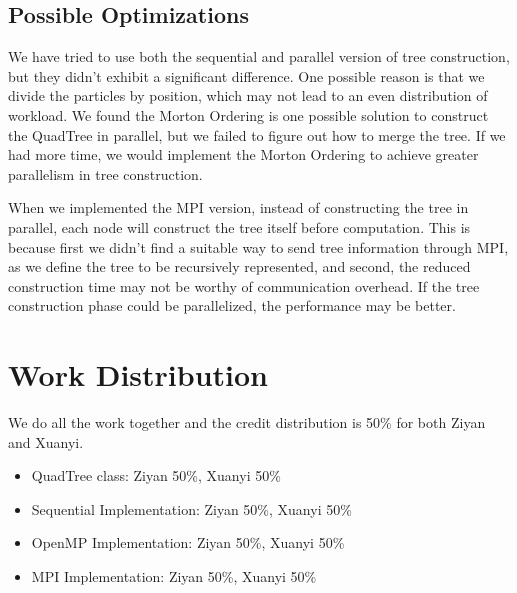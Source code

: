 \documentclass{article}
\begin{document}
\subsection{Possible Optimizations}
We have tried to use both the sequential and parallel version of tree construction, but they didn't exhibit a significant difference. One possible reason is that we divide the particles by position, which may not lead to an even distribution of workload. We found the Morton Ordering is one possible solution to construct the QuadTree in parallel, but we failed to figure out how to merge the tree. If we had more time, we would implement the Morton Ordering to achieve greater parallelism in tree construction.

When we implemented the MPI version, instead of constructing the tree in parallel, each node will construct the tree itself before computation. This is because first we didn't find a suitable way to send tree information through MPI, as we define the tree to be recursively represented, and second, the reduced construction time may not be worthy of communication overhead. If the tree construction phase could be parallelized, the performance may be better. 

\section{Work Distribution}
We do all the work together and the credit distribution is 50\% for both Ziyan and Xuanyi.
\begin{itemize}
	\item QuadTree class: Ziyan 50\%, Xuanyi 50\%
	\item Sequential Implementation: Ziyan 50\%, Xuanyi 50\%
	\item OpenMP Implementation: Ziyan 50\%, Xuanyi 50\%
	\item MPI Implementation: Ziyan 50\%, Xuanyi 50\%
\end{itemize}




{

}
\end{document}
